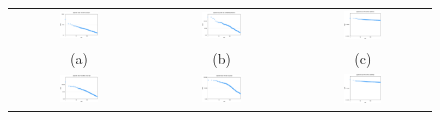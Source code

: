 \begin{figure}[!h]
\begin{center}
\begin{tabular}{c c c}
     \includegraphics[width=0.3\textwidth]{FIG/t2_amazon.png} &
     \includegraphics[width=0.3\textwidth]{FIG/t2_berke.png} &
     \includegraphics[width=0.3\textwidth]{FIG/t2_ca.png}\\
    (a) & (b) & (c)\\
     \includegraphics[width=0.3\textwidth]{FIG/t2_enron.png} &
     \includegraphics[width=0.3\textwidth]{FIG/t2_google.png} &
     \includegraphics[width=0.3\textwidth]{FIG/t2_pa.png} \\

\end{tabular}
\end{center}
\end{figure}
